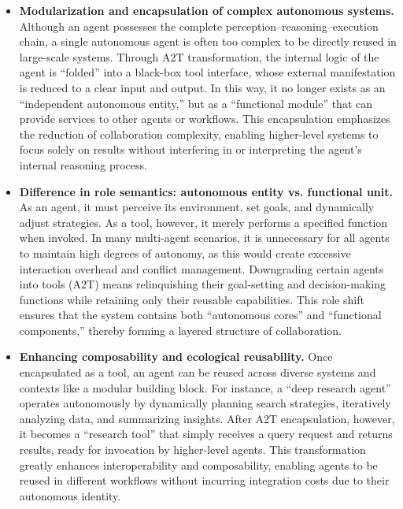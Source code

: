\documentclass[11pt]{article}
\begin{document}
\begin{itemize}[leftmargin=*,itemsep=0.1em]
  \item \textbf{Modularization and encapsulation of complex autonomous systems.}  
  Although an agent possesses the complete perception–reasoning–execution chain, a single autonomous agent is often too complex to be directly reused in large-scale systems. Through A2T transformation, the internal logic of the agent is ``folded'' into a black-box tool interface, whose external manifestation is reduced to a clear input and output. In this way, it no longer exists as an ``independent autonomous entity,'' but as a ``functional module'' that can provide services to other agents or workflows. This encapsulation emphasizes the reduction of collaboration complexity, enabling higher-level systems to focus solely on results without interfering in or interpreting the agent’s internal reasoning process.

  \item \textbf{Difference in role semantics: autonomous entity vs. functional unit.}  
  As an agent, it must perceive its environment, set goals, and dynamically adjust strategies. As a tool, however, it merely performs a specified function when invoked. In many multi-agent scenarios, it is unnecessary for all agents to maintain high degrees of autonomy, as this would create excessive interaction overhead and conflict management. Downgrading certain agents into tools (A2T) means relinquishing their goal-setting and decision-making functions while retaining only their reusable capabilities. This role shift ensures that the system contains both ``autonomous cores'' and ``functional components,'' thereby forming a layered structure of collaboration.

  \item \textbf{Enhancing composability and ecological reusability.}  
  Once encapsulated as a tool, an agent can be reused across diverse systems and contexts like a modular building block. For instance, a ``deep research agent'' operates autonomously by dynamically planning search strategies, iteratively analyzing data, and summarizing insights. After A2T encapsulation, however, it becomes a ``research tool'' that simply receives a query request and returns results, ready for invocation by higher-level agents. This transformation greatly enhances interoperability and composability, enabling agents to be reused in different workflows without incurring integration costs due to their autonomous identity.  
\end{itemize}
\end{document}
